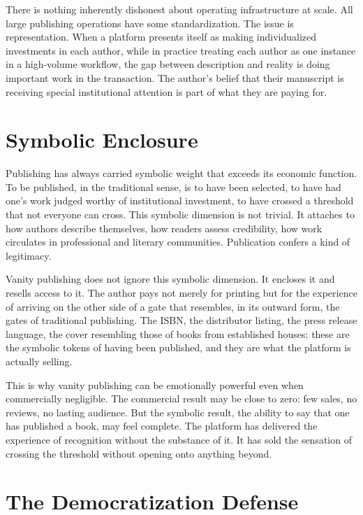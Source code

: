 \documentclass[12pt, a4paper]{article}
\begin{document}
There is nothing inherently dishonest about operating infrastructure at scale. All large publishing operations have some standardization. The issue is representation. When a platform presents itself as making individualized investments in each author, while in practice treating each author as one instance in a high-volume workflow, the gap between description and reality is doing important work in the transaction. The author's belief that their manuscript is receiving special institutional attention is part of what they are paying for.

\section{Symbolic Enclosure}

Publishing has always carried symbolic weight that exceeds its economic function. To be published, in the traditional sense, is to have been selected, to have had one's work judged worthy of institutional investment, to have crossed a threshold that not everyone can cross. This symbolic dimension is not trivial. It attaches to how authors describe themselves, how readers assess credibility, how work circulates in professional and literary communities. Publication confers a kind of legitimacy.

Vanity publishing does not ignore this symbolic dimension. It encloses it and resells access to it. The author pays not merely for printing but for the experience of arriving on the other side of a gate that resembles, in its outward form, the gates of traditional publishing. The ISBN, the distributor listing, the press release language, the cover resembling those of books from established houses: these are the symbolic tokens of having been published, and they are what the platform is actually selling.

This is why vanity publishing can be emotionally powerful even when commercially negligible. The commercial result may be close to zero: few sales, no reviews, no lasting audience. But the symbolic result, the ability to say that one has published a book, may feel complete. The platform has delivered the experience of recognition without the substance of it. It has sold the sensation of crossing the threshold without opening onto anything beyond.

\section{The Democratization Defense}
\end{document}

